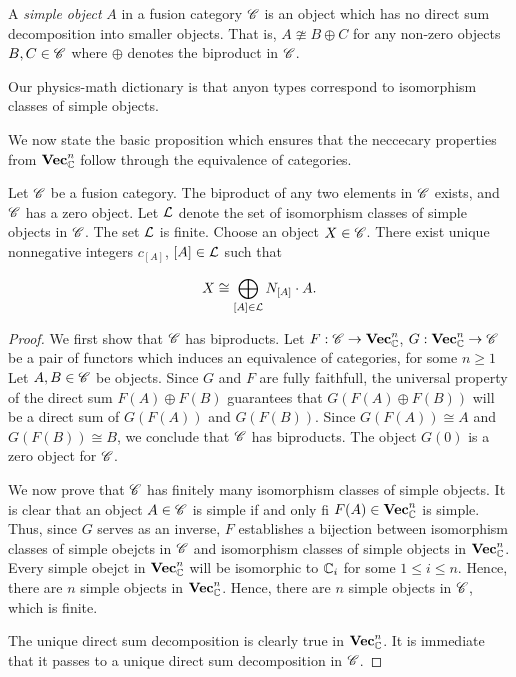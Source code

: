 \begin{definition} A \textit{simple object} $A$ in a fusion category $\mathscr{C}$ is an object which has no direct sum decomposition into smaller objects. That is, $A\ncong B\oplus C$ for any non-zero objects $B,C\in \mathscr{C}$ where $\oplus$ denotes the biproduct in $\mathscr{C}$.
\end{definition}

Our physics-math dictionary is that anyon types correspond to isomorphism classes of simple objects.

We now state the basic proposition which ensures that the neccecary properties from $\mathbf{Vec}_{\mathbb{C}}^n$ follow through the equivalence of categories.

\begin{proposition} Let $\mathscr{C}$ be a fusion category. The biproduct of any two elements in $\mathscr{C}$ exists, and $\mathscr{C}$ has a zero object. Let $\mathcal{L}$ denote the set of isomorphism classes of simple objects in $\mathscr{C}$. The set $\mathcal{L}$ is finite. Choose an object $X\in \mathscr{C}$. There exist unique nonnegative integers $c_{[A]}$, $[A]\in \mathcal{L}$ such that 

$$X\cong \bigoplus_{[A]\in \mathcal{L}}N_{[A]}\cdot A.$$
\end{proposition}
\begin{proof} We first show that $\mathscr{C}$ has biproducts. Let $F:\mathscr{C}\to \mathbf{Vec}_{\mathbb{C}}^n$, $G:\mathbf{Vec}_{\mathbb{C}}^n\to \mathscr{C}$ be a pair of functors which induces an equivalence of categories, for some $n\geq 1$ Let $A,B\in \mathscr{C}$ be objects. Since $G$ and $F$ are fully faithfull, the universal property of the direct sum $F(A)\oplus F(B)$ guarantees that $G(F(A)\oplus F(B))$ will be a direct sum of $G(F(A))$ and $G(F(B))$. Since $G(F(A))\cong A$ and $G(F(B))\cong B$, we conclude that $\mathscr{C}$ has biproducts. The object $G(0)$ is a zero object for $\mathscr{C}$.

We now prove that $\mathscr{C}$ has finitely many isomorphism classes of simple objects. It is clear that an object $A\in \mathscr{C}$ is simple if and only fi $F(A)\in \mathbf{Vec}_{\mathbb{C}}^n$ is simple. Thus, since $G$ serves as an inverse, $F$ establishes a bijection between isomorphism classes of simple obejcts in $\mathscr{C}$ and isomorphism classes of simple objects in $\mathbf{Vec}_{\mathbb{C}}^n$. Every simple obejct in $\mathbf{Vec}_{\mathbb{C}}^n$ will be isomorphic to $\mathbb{C}_i$ for some $1\leq i \leq n$. Hence, there are $n$ simple objects in $\mathbf{Vec}_{\mathbb{C}}^n$. Hence, there are $n$ simple objects in $\mathscr{C}$, which is finite.

The unique direct sum decomposition is clearly true in $\mathbf{Vec}_{\mathbb{C}}^n$. It is immediate that it passes to a unique direct sum decomposition in $\mathscr{C}$.
\end{proof}

